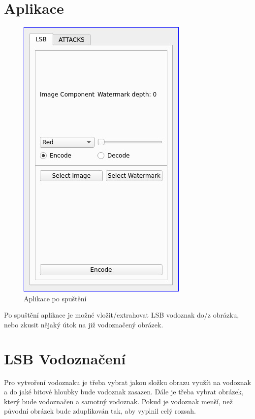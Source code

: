 \section[aplikace]{Aplikace}

\begin{figure}[h]
    \begin{center}
        \includegraphics[scale=0.5]{images/app.jpg}
        \caption{Aplikace po spuštění}
    \end{center}
\end{figure}

Po spuštění aplikace je možné vložit/extrahovat LSB vodoznak do/z obrázku, nebo zkusit nějaký útok na již vodoznačený obrázek.

\section[lsb]{LSB Vodoznačení}

Pro vytvoření vodoznaku je třeba vybrat jakou složku obrazu využít na vodoznak a do jaké bitové hloubky bude vodoznak zasazen. Dále je třeba vybrat obrázek, který bude vodoznačen a samotný vodoznak. Pokud je vodoznak menší, než původní obrázek bude zduplikován tak, aby vyplnil celý rozsah.

